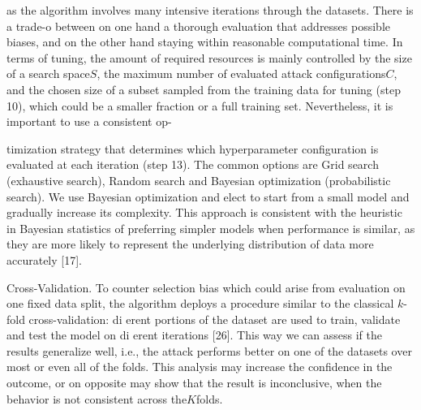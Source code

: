 \documentclass[a4paper,12pt]{article}
\begin{document}
as the algorithm involves many intensive iterations through the datasets. There is a trade-o between on one hand a thorough evaluation that addresses possible biases, and on the other hand staying within reasonable computational time. In terms of tuning, the amount of required resources is mainly controlled by the size of a search space$S$, the maximum number of evaluated attack configurations$C$, and the chosen size of a subset sampled from the training data for tuning (step 10), which could be a smaller fraction or a full training set. Nevertheless, it is important to use a consistent op-

timization strategy that determines which hyperparameter configuration is evaluated at each iteration (step 13). The common options are Grid search (exhaustive search), Random search and Bayesian optimization (probabilistic search). We use Bayesian optimization and elect to start from a small model and gradually increase its complexity. This approach is consistent with the heuristic in Bayesian statistics of preferring simpler models when performance is similar, as they are more likely to represent the underlying distribution of data more accurately [17].

Cross-Validation. To counter selection bias which could arise from evaluation on one fixed data split, the algorithm deploys a procedure similar to the classical $k$-fold cross-validation: di erent portions of the dataset are used to train, validate and test the model on di erent iterations [26]. This way we can assess if the results generalize well, i.e., the attack performs better on one of the datasets over most or even all of the folds. This analysis may increase the confidence in the outcome, or on opposite may show that the result is inconclusive, when the behavior is not consistent across the$K$folds.
\end{document}
